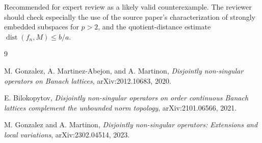 \documentclass[11pt]{article}
\newcommand{\dist}{\operatorname{dist}}
\begin{document}
Recommended for expert review as a likely valid counterexample. The reviewer should check especially the use of the source paper's characterization of strongly embedded subspaces for \(p>2\), and the quotient-distance estimate \(\dist(f_n,M)\leq b/a\).

\begin{thebibliography}{9}

M. Gonzalez, A. Martinez-Abejon, and A. Martinon,
\emph{Disjointly non-singular operators on Banach lattices},
arXiv:2012.10683, 2020.

E. Bilokopytov,
\emph{Disjointly non-singular operators on order continuous Banach lattices complement the unbounded norm topology},
arXiv:2101.06566, 2021.

M. Gonzalez and A. Martinon,
\emph{Disjointly non-singular operators: Extensions and local variations},
arXiv:2302.04514, 2023.

\end{thebibliography}
\end{document}
